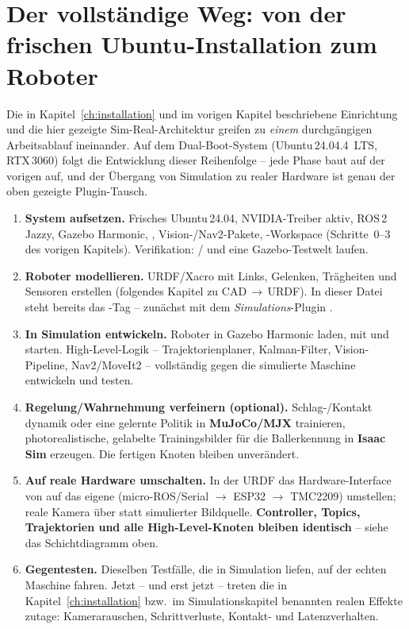 \section{Der vollständige Weg: von der frischen Ubuntu-Installation zum Roboter}
Die in Kapitel~\ref{ch:installation} und im vorigen Kapitel beschriebene
Einrichtung und die hier gezeigte Sim-Real-Architektur greifen zu \emph{einem}
durchgängigen Arbeitsablauf ineinander. Auf dem Dual-Boot-System
(Ubuntu\,24.04.4~LTS, RTX\,3060) folgt die Entwicklung dieser Reihenfolge --
jede Phase baut auf der vorigen auf, und der Übergang von Simulation zu realer
Hardware ist genau der oben gezeigte Plugin-Tausch.

\begin{enumerate}
\item \textbf{System aufsetzen.} Frisches Ubuntu\,24.04, NVIDIA-Treiber aktiv,
  ROS\,2 Jazzy, Gazebo Harmonic, , Vision-/Nav2-Pakete,
  -Workspace (Schritte~0--3 des vorigen Kapitels). Verifikation:
  / und eine Gazebo-Testwelt laufen.
\item \textbf{Roboter modellieren.} URDF/Xacro mit Links, Gelenken, Trägheiten
  und Sensoren erstellen (folgendes Kapitel zu CAD\,$\to$\,URDF). In dieser
  Datei steht bereits das -Tag -- zunächst mit dem
  \emph{Simulations}-Plugin .
\item \textbf{In Simulation entwickeln.} Roboter in Gazebo Harmonic laden,
   mit  und
   starten. High-Level-Logik --
  Trajektorienplaner, Kalman-Filter, Vision-Pipeline, Nav2/MoveIt2 --
  vollständig gegen die simulierte Maschine entwickeln und testen.
\item \textbf{Regelung/Wahrnehmung verfeinern (optional).} Schlag-/Kontakt\-%
  dynamik oder eine gelernte Politik in \textbf{MuJoCo/MJX} trainieren,
  photorealistische, gelabelte Trainingsbilder für die Ballerkennung in
  \textbf{Isaac Sim} erzeugen. Die fertigen Knoten bleiben unverändert.
\item \textbf{Auf reale Hardware umschalten.} In der URDF das Hardware-Interface
  von  auf das eigene
   (micro-ROS/Serial
  $\rightarrow$ ESP32 $\rightarrow$ TMC2209) umstellen; reale Kamera über
   statt simulierter Bildquelle. \textbf{Controller, Topics,
  Trajektorien und alle High-Level-Knoten bleiben identisch} -- siehe das
  Schichtdiagramm oben.
\item \textbf{Gegentesten.} Dieselben Testfälle, die in Simulation liefen, auf
  der echten Maschine fahren. Jetzt -- und erst jetzt -- treten die in
  Kapitel~\ref{ch:installation} bzw.\ im Simulationskapitel benannten
  realen Effekte zutage: Kamerarauschen, Schrittverluste, Kontakt- und
  Latenzverhalten.
\end{enumerate}

